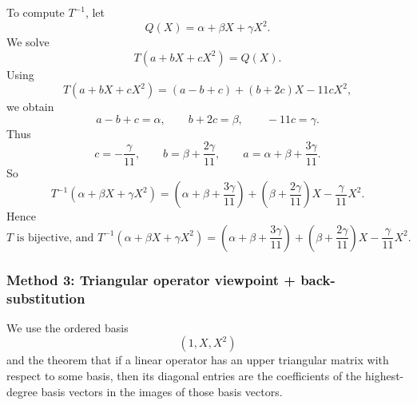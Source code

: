 \documentclass[12pt]{article}
\begin{document}
\begin{enumerate}[label=(\alph*)]
To compute \(T^{-1}\), let
\[
Q(X)=\alpha+\beta X+\gamma X^2.
\]
We solve
\[
T(a+bX+cX^2)=Q(X).
\]
Using
\[
T(a+bX+cX^2)=(a-b+c)+(b+2c)X-11cX^2,
\]
we obtain
\[
a-b+c=\alpha,\qquad
b+2c=\beta,\qquad
-11c=\gamma.
\]
Thus
\[
c=-\frac{\gamma}{11},\qquad
b=\beta+\frac{2\gamma}{11},\qquad
a=\alpha+\beta+\frac{3\gamma}{11}.
\]
So
\[
T^{-1}(\alpha+\beta X+\gamma X^2)
=
\left(\alpha+\beta+\frac{3\gamma}{11}\right)
+
\left(\beta+\frac{2\gamma}{11}\right)X
-
\frac{\gamma}{11}X^2.
\]
Hence
\[
\boxed{
T \text{ is bijective, and }
T^{-1}(\alpha+\beta X+\gamma X^2)
=
\left(\alpha+\beta+\frac{3\gamma}{11}\right)
+
\left(\beta+\frac{2\gamma}{11}\right)X
-
\frac{\gamma}{11}X^2.}
\]
\end{enumerate}

\newpage
\subsubsection{Method 3: Triangular operator viewpoint + back-substitution}
We use the ordered basis
\[
(1,X,X^2)
\]
and the theorem that if a linear operator has an upper triangular matrix with respect to some basis, then its diagonal entries are the coefficients of the highest-degree basis vectors in the images of those basis vectors.
\end{document}
